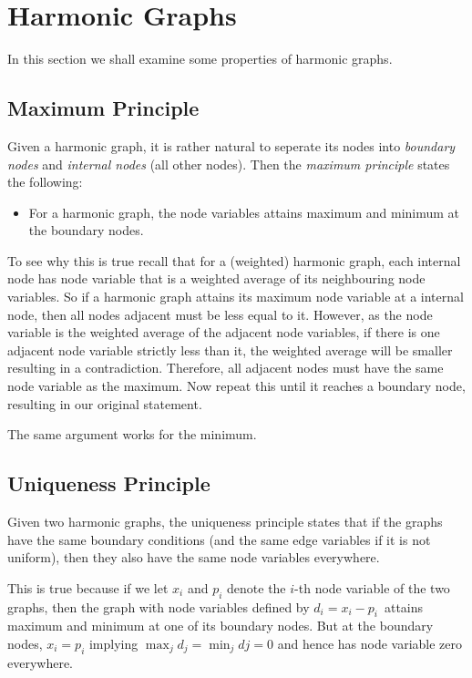 \documentclass[]{article}
\providecommand{\tightlist}{%
  \setlength{\itemsep}{0pt}\setlength{\parskip}{0pt}}
\begin{document}
\section{Harmonic Graphs}\label{harmonic-graphs}

In this section we shall examine some properties of harmonic graphs.

\subsection{Maximum Principle}\label{maximum-principle}

Given a harmonic graph, it is rather natural to seperate its nodes into
\emph{boundary nodes} and \emph{internal nodes} (all other nodes). Then
the \emph{maximum principle} states the following:

\begin{itemize}
\tightlist
\item
  For a harmonic graph, the node variables attains maximum and minimum
  at the boundary nodes.
\end{itemize}

To see why this is true recall that for a (weighted) harmonic graph,
each internal node has node variable that is a weighted average of its
neighbouring node variables. So if a harmonic graph attains its maximum
node variable at a internal node, then all nodes adjacent must be less
equal to it. However, as the node variable is the weighted average of
the adjacent node variables, if there is one adjacent node variable
strictly less than it, the weighted average will be smaller resulting in
a contradiction. Therefore, all adjacent nodes must have the same node
variable as the maximum. Now repeat this until it reaches a boundary
node, resulting in our original statement.

The same argument works for the minimum.

\subsection{Uniqueness Principle}\label{uniqueness-principle}

Given two harmonic graphs, the uniqueness principle states that if the
graphs have the same boundary conditions (and the same edge variables if
it is not uniform), then they also have the same node variables
everywhere.

This is true because if we let \(x_i\) and \(p_i\) denote the \(i\)-th
node variable of the two graphs, then the graph with node variables
defined by \(d_i = x_i - p_i\)~attains maximum and minimum at one of its
boundary nodes. But at the boundary nodes, \(x_i = p_i\) implying
\(\max_j d_j = \min_j dj = 0\) and hence has node variable zero
everywhere.
\end{document}
